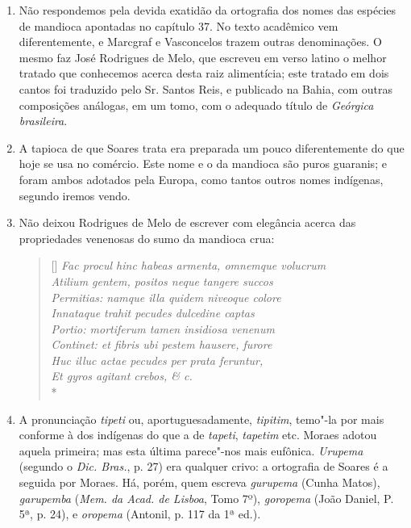 \begin{enumerate}
\item Não respondemos pela devida exatidão da ortografia dos nomes das espécies de 
mandioca apontadas no capítulo 37. No texto acadêmico vem diferentemente, e 
Marcgraf e Vasconcelos trazem outras denominações. O mesmo faz José Rodrigues de 
Melo, que escreveu em verso latino o melhor tratado que conhecemos acerca desta raiz 
alimentícia; este tratado em dois cantos foi traduzido pelo Sr. Santos Reis, e 
publicado na Bahia, com outras composições análogas, em um tomo, com o adequado 
título de \textit{Geórgica brasileira}.

\item A tapioca de que Soares trata era preparada um pouco diferentemente do que hoje 
se usa no comércio. Este nome e o da mandioca são puros guaranis; e foram ambos 
adotados pela Europa, como tantos outros nomes indígenas, segundo iremos vendo.

\item Não deixou Rodrigues de Melo de escrever com elegância acerca das 
propriedades venenosas do sumo da mandioca crua: 

\settowidth{\versewidth}{Fac procul hinc habeas armenta, omnemque volucrum}
\begin{verse}[\versewidth]
\textit{Fac procul hinc habeas armenta, omnemque \qb{}volucrum \\
Atilium gentem, positos neque tangere succos \\
Permitias: namque illa quidem niveoque colore \\
Innataque trahit pecudes dulcedine captas \\
Portio: mortiferum tamen insidiosa venenum \\
Continet: et fibris ubi pestem hausere, furore \\
Huc illuc actae pecudes per prata feruntur, \\
Et gyros agitant crebos, \& c.}\\*
\end{verse}

\item  A pronunciação \textit{tipeti} ou, aportuguesadamente, \textit{tipitim}, temo"-la por
mais conforme à dos indígenas do que a de \textit{tapeti}, \textit{tapetim} etc. Moraes
adotou aquela primeira; mas esta última parece"-nos mais eufônica. \textit{Urupema}
(segundo o \textit{Dic. Bras.}, p. 27) era qualquer crivo: a ortografia de Soares é
a seguida por Moraes. Há, porém, quem escreva \textit{gurupema} (Cunha Matos), \textit{garupemba} 
(\textit{Mem. da Acad. de Lisboa}, Tomo 7º), \textit{goropema} (João Daniel, P. 5ª, p. 24), e \textit{oropema} 
(Antonil, p. 117 da 1ª ed.).


\end{enumerate}

